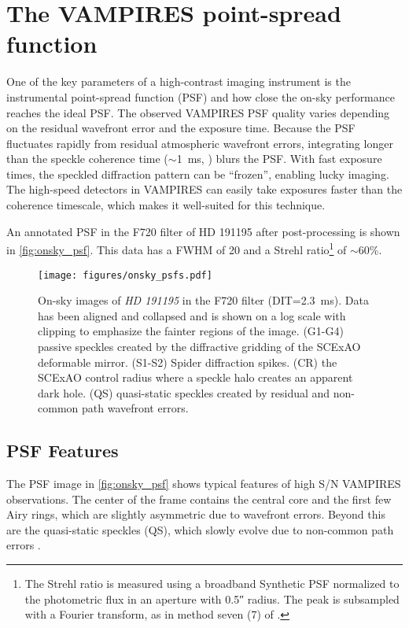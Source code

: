 \section{The VAMPIRES point-spread function}\label{sec:psf}

One of the key parameters of a high-contrast imaging instrument is the instrumental point-spread function (PSF) and how close the on-sky performance reaches the ideal PSF. The observed VAMPIRES PSF quality varies depending on the residual wavefront error and the exposure time. Because the PSF fluctuates rapidly from residual atmospheric wavefront errors, integrating longer than the speckle coherence time ($\sim$\SI{1}{\milli\second}, \citealp{kooten_climate_2022}) blurs the PSF. With fast exposure times, the speckled diffraction pattern can be ``frozen'', enabling lucky imaging. The high-speed detectors in VAMPIRES can easily take exposures faster than the coherence timescale, which makes it well-suited for this technique.


An annotated PSF in the F720 filter of HD 191195 after post-processing is shown in \autoref{fig:onsky_psf}. This data has a FWHM of \SI{20}{\mas} and a Strehl ratio\footnote{The Strehl ratio is measured using a broadband Synthetic PSF normalized to the photometric flux in an aperture with \ang{;;0.5} radius. The peak is subsampled with a Fourier transform, as in method seven (7) of \citet{jr_is_2004}.} of $\sim$60\%.

\begin{figure}
    \centering
    \texttt{[image: figures/onsky\_psfs.pdf]}
    \caption{On-sky images of \textit{HD 191195} in the F720 filter (DIT=\SI{2.3}{\milli\second}). Data has been aligned and collapsed and is shown on a log scale with clipping to emphasize the fainter regions of the image. (G1-G4) passive speckles created by the diffractive gridding of the SCExAO deformable mirror. (S1-S2) Spider diffraction spikes. (CR) the SCExAO control radius where a speckle halo creates an apparent dark hole. (QS) quasi-static speckles created by residual and non-common path wavefront errors.\label{fig:onsky_psf}}
\end{figure}

\subsection{PSF Features}
The PSF image in \autoref{fig:onsky_psf} shows typical features of high S/N VAMPIRES observations. The center of the frame contains the central core and the first few Airy rings, which are slightly asymmetric due to wavefront errors. Beyond this are the quasi-static speckles (QS), which slowly evolve due to non-common path errors \citep{soummer_speckle_2007,ndiaye_calibration_2013}.


